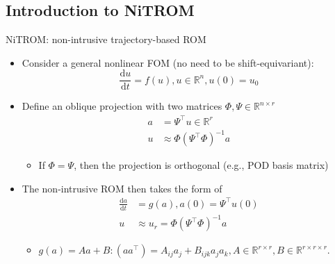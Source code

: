 \documentclass[presentation]{beamer}
\begin{document}
\subsection{Introduction to NiTROM}
\label{sec:org888baa8}
\begin{frame}[label={sec:org78524fc}]{NiTROM: non-intrusive trajectory-based ROM}
\begin{itemize}[<+->]
\item Consider a general nonlinear FOM (no need to be shift-equivariant):
\begin{equation}
   \label{eq:1}
   \frac{\mathrm{d}u}{\mathrm{d}t} = f(u), u\in\mathbb{R}^{n}, u(0) = u_{0}
\end{equation}
\item Define an oblique projection with two matrices \(\Phi, \Psi\in\mathbb{R}^{n\times r}\)
\begin{subequations}
\begin{align}
  \label{eq:2}
  a &= \Psi^{\top}u\in\mathbb{R}^{r}\\
  u &\approx \Phi(\Psi^{\top}\Phi)^{-1}a
\end{align}
\end{subequations}
\begin{itemize}
\item If \(\Phi = \Psi\), then the projection is orthogonal (e.g., POD basis matrix)
\end{itemize}
\item The non-intrusive ROM then takes the form of
\begin{subequations}
\begin{align}
  \label{eq:3}
  \frac{\mathrm{d}a}{\mathrm{d}t} &= g(a), a(0) = \Psi^{\top}u(0)\\
  u &\approx u_{r} = \Phi(\Psi^{\top}\Phi)^{-1}a
\end{align}
\end{subequations}
\begin{itemize}
\item \(g(a) = Aa + B:(aa^{\top}) = A_{ij}a_{j} + B_{ijk}a_{j}a_{k}, A\in\mathbb{R}^{r\times r}, B\in\mathbb{R}^{r\times r\times r}\).
\end{itemize}
\end{itemize}
\end{frame}
\end{document}
